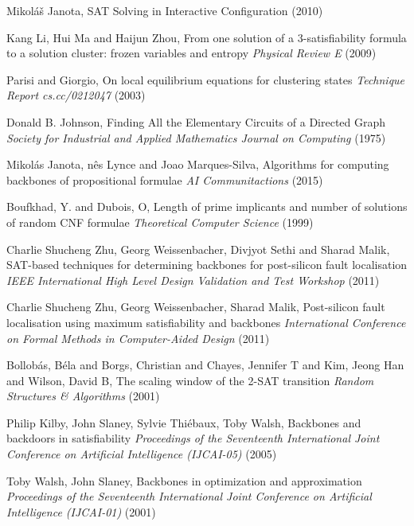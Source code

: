 	Mikol\'{a}\v{s} Janota,
        {{SAT} Solving in Interactive Configuration}
        (2010)

	Kang Li, Hui Ma and Haijun Zhou,
        From one solution of a 3-satisfiability formula to a solution cluster: frozen variables and entropy
	\textit{Physical Review E}
        (2009)
		
	Parisi and Giorgio,
        On local equilibrium equations for clustering states
		\textit{Technique Report cs.cc/0212047}
        (2003)	

	Donald B. Johnson,
        Finding All the Elementary Circuits of a Directed Graph
	\textit{Society for Industrial and Applied Mathematics Journal on Computing}
        (1975)
		
	Mikol{\'{a}}s Janota, n{\^{e}}s Lynce and  Joao Marques-Silva,
        Algorithms for computing backbones of propositional formulae
		\textit{{AI} Communitactions}
        (2015)

	Boufkhad, Y. and Dubois, O,
        Length of prime implicants and number of solutions of random CNF formulae
		\textit{Theoretical Computer Science}
        (1999)


	Charlie Shucheng Zhu, Georg Weissenbacher, Divjyot Sethi and Sharad Malik,
        {SAT}-based techniques for determining backbones for post-silicon fault localisation
		\textit{IEEE International High Level Design Validation and Test Workshop}
        (2011)

	Charlie Shucheng Zhu, Georg Weissenbacher, Sharad Malik,
        Post-silicon fault localisation using maximum satisfiability and backbones
		\textit{International Conference on Formal Methods in Computer-Aided Design}
        (2011)

	Bollob{\'a}s, B{\'e}la and Borgs, Christian and Chayes, Jennifer T and Kim, Jeong Han and Wilson, David B,
        The scaling window of the 2-{SAT} transition
		\textit{Random Structures \& Algorithms}
        (2001)
		
	Philip Kilby, John Slaney, Sylvie Thi{\'e}baux, Toby Walsh,
        Backbones and backdoors in satisfiability
		\textit{Proceedings of the Seventeenth International Joint Conference on Artificial Intelligence (IJCAI-05)}
        (2005)
		
	Toby Walsh, John Slaney,
        Backbones in optimization and approximation
		\textit{Proceedings of the Seventeenth International Joint Conference on Artificial Intelligence (IJCAI-01)}
        (2001)

